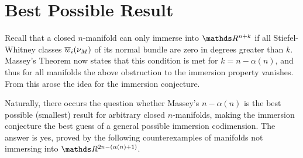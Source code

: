 \section{Best Possible Result}\label{sec:bestpossibleresult}
Recall that a closed $n$-manifold can only immerse into
$\R^{n+k}$ if all Stiefel-Whitney classes ${\overline{w}_{i}}(\nu_{M})$ of its
normal bundle are zero in degrees greater than $k$.
Massey's Theorem now states that this condition is met for
$k=n-\alpha(n)$, and thus for all manifolds the above
obstruction to the immersion property vanishes. From this arose the
idea for the immersion conjecture.

Naturally, there occurs the question whether Massey's $n-\alpha(n)$ is
the best possible (\idest smallest) result for arbitrary closed
$n$-manifolds, making the immersion conjecture the best
guess of a general possible immersion codimension.
The answer is yes, proved by the following counterexamples of manifolds
not immersing into $\R^{2n-(\alpha(n)+1)}$.


